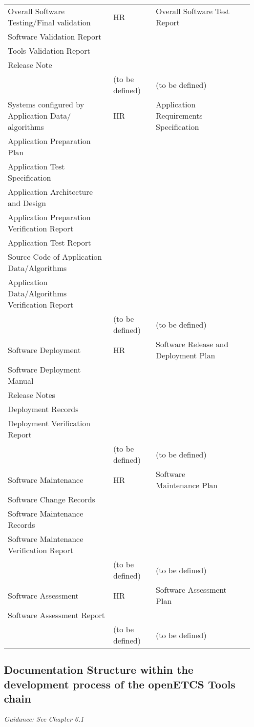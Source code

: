 \documentclass{template/openetcs_article}
\begin{document}
\begin{center}
\begin{longtable}{|m{2cm}|m{1cm}|m{7cm}|m{2cm}|m{2cm}|}
Overall Software Testing/Final validation &
\centering HR &
\raggedright
Overall Software Test Report\\
Software Validation Report\\
Tools Validation Report\\ 
Release Note\\ &
(to be defined) &
(to be defined)
\\\hline
Systems configured by Application Data/ algorithms &
\centering HR &
\raggedright
Application Requirements Specification\\
Application Preparation Plan\\
Application Test Specification\\ 
Application Architecture and Design\\ 
Application Preparation Verification Report\\ 
Application Test Report\\ 
Source Code of Application Data/Algorithms\\ 
Application Data/Algorithms Verification Report\\ &
(to be defined) &
(to be defined)
\\\hline
Software Deployment &
\centering HR &
\raggedright
Software Release and Deployment Plan\\
Software Deployment Manual\\
Release Notes\\ 
Deployment Records\\ 
Deployment Verification Report\\ &
(to be defined) &
(to be defined)
\\\hline
Software Maintenance &
\centering HR &
\raggedright
Software Maintenance Plan\\
Software Change Records\\
Software Maintenance Records\\ 
Software Maintenance Verification Report\\ &
(to be defined) &
(to be defined)
\\\hline
Software Assessment &
\centering HR &
\raggedright
Software Assessment Plan\\ 
Software Assessment Report\\ &
(to be defined) &
(to be defined)
\\\hline
\end{longtable}
\end{center}


\subsection{Documentation Structure within the development process of the openETCS Tools chain}
\textit{Guidance: See Chapter 6.1}
\end{document}
